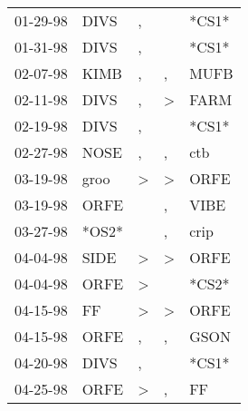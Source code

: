 \begin{supertabular}{p{0.07\textwidth}p{0.06\textwidth}p{0.02\textwidth}p{0.02\textwidth}p{0.06\textwidth}}
          01-29-98\textsuperscript{} &  DIVS\textsuperscript{} &             , &               &                   *CS1* \\
          01-31-98\textsuperscript{} &  DIVS\textsuperscript{} &             , &               &                   *CS1* \\
          02-07-98\textsuperscript{} &  KIMB\textsuperscript{} &             , &             , &  MUFB\textsuperscript{} \\
          02-11-98\textsuperscript{} &  DIVS\textsuperscript{} &             , &  \textgreater &  FARM\textsuperscript{} \\
          02-19-98\textsuperscript{} &  DIVS\textsuperscript{} &             , &               &                   *CS1* \\
          02-27-98\textsuperscript{} &  NOSE\textsuperscript{} &             , &             , &   ctb\textsuperscript{} \\
          03-19-98\textsuperscript{} &  groo\textsuperscript{} &  \textgreater &  \textgreater &  ORFE\textsuperscript{} \\
          03-19-98\textsuperscript{} &  ORFE\textsuperscript{} &               &             , &  VIBE\textsuperscript{} \\
          03-27-98\textsuperscript{} &                   *OS2* &               &             , &  crip\textsuperscript{} \\
          04-04-98\textsuperscript{} &  SIDE\textsuperscript{} &  \textgreater &  \textgreater &  ORFE\textsuperscript{} \\
          04-04-98\textsuperscript{} &  ORFE\textsuperscript{} &  \textgreater &               &                   *CS2* \\
          04-15-98\textsuperscript{} &    FF\textsuperscript{} &  \textgreater &  \textgreater &  ORFE\textsuperscript{} \\
          04-15-98\textsuperscript{} &  ORFE\textsuperscript{} &             , &             , &  GSON\textsuperscript{} \\
          04-20-98\textsuperscript{} &  DIVS\textsuperscript{} &             , &               &                   *CS1* \\
          04-25-98\textsuperscript{} &  ORFE\textsuperscript{} &  \textgreater &             , &    FF\textsuperscript{} \\

\end{supertabular}
